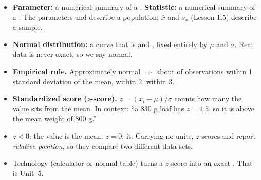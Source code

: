 \boxguard[12]
\begin{tcolorbox}[enhanced, colback=sky, colframe=navy, boxrule=0.8pt, arc=2mm,
    left=3mm, right=3mm, top=1.5mm, bottom=1.5mm, breakable,
    fonttitle=\bfseries\small\color{white}, title={QuickNotes: The Normal Distribution and z-Scores},
    attach boxed title to top left={yshift=-2mm, xshift=4mm},
    boxed title style={colback=navy, colframe=navy, arc=1.5mm}]
\small
\begin{itemize}[leftmargin=1.1em, itemsep=2pt]
  \item \textbf{Parameter:} a numerical summary of a . \textbf{Statistic:} a
        numerical summary of a . The parameters \ans{$\mu$} and \ans{$\sigma$}
        describe a population; $\bar x$ and $s_x$ (Lesson 1.5) describe a sample.
  \item \textbf{Normal distribution:} a curve that is  and , fixed
        entirely by $\mu$ and $\sigma$. Real data is never exact, so we say  normal.
  \item \textbf{Empirical rule.} Approximately normal $\Rightarrow$ about  of
        observations within 1 standard deviation of the mean,  within 2,
         within 3.
  \item \textbf{Standardized score ($z$-score).} $z = (x_i - \mu)/\sigma$ counts how many
         the value sits from the mean. In context: ``a 830 g loaf has $z = 1.5$, so
        it is  above the mean weight of 800 g.''
  \item $z < 0$: the value is  the mean. $z = 0$:  it. Carrying no
        units, $z$-scores and  report \emph{relative position}, so they compare two
        different data sets.
  \item Technology (calculator or normal table) turns a $z$-score into an exact .
        That is Unit~5.
\end{itemize}
\end{tcolorbox}

